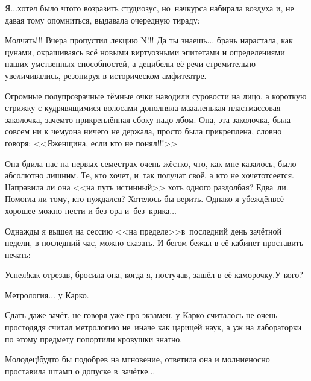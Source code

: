 \diagdash Я$\ldots$\mdash хотел было что\sdash то возразить студиозус, но~начкурса набирала воздуха и, не давая тому опомниться, выдавала очередную тираду:

\diagdash Молчать!!! Вчера пропустил лекцию N!!! Да ты знаешь$\ldots$ \mdash брань нарастала, как цунами, окрашиваясь всё новыми виртуозными эпитетами и определениями наших умственных способностей, а децибелы её речи стремительно увеличивались, резонируя в историческом амфитеатре.

Огромные полупрозрачные тёмные очки наводили суровости на лицо, а короткую стрижку с кудрявящимися волосами дополняла ма\sdash а\sdash аленькая пластмассовая заколочка, зачем\sdash то прикреплённая сбоку надо лбом. Она, эта заколочка, была совсем ни к чему\mdash она ничего не держала, просто была прикреплена, словно говоря: <<Я\mdash женщина, если кто не понял!!!>>


Она бдила нас на первых семестрах очень жёстко, что, как мне казалось, было абсолютно лишним. Те, кто хочет, и~так получат своё, а кто не хочет\mdash отсеется. Направила ли она <<на путь истинный>> хоть одного раздолбая? Едва~ли. Помогла ли тому, кто нуждался? Хотелось бы верить. Однако я убеждён\mdash всё хорошее можно нести и без ора и~без~крика$\ldots$

Однажды я вышел на сессию <<на пределе>>\mdash в~последний день зачётной недели, в последний час, можно сказать. И бегом бежал в её кабинет проставить печать:

\diagdash Успел!\mdash как отрезав, бросила она, когда я, постучав, зашёл в её каморочку.\mdash У кого?

\diagdash Метрология$\ldots$ у Кар\sdash ко.

Сдать даже зачёт, не говоря уже про экзамен, у Кар\sdash ко считалось не очень просто\mdash дядя считал метрологию не~иначе как царицей наук, а уж на лабораторки по этому предмету попортили кровушки знатно.

\diagdash Молодец!\mdash будто бы подобрев на мгновение, ответила она и молниеносно проставила штамп о допуске в~зачётке$\ldots$

\begin{center}
\end{center}
